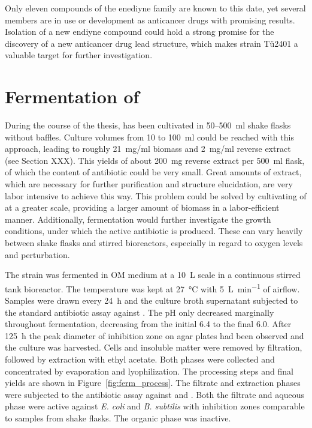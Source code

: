 Only eleven compounds of the enediyne family are known to this date, yet several members are in use or development as anticancer drugs with promising results.\autocite{Liang2010,Galm2005}
Isolation of a new endiyne compound could hold a strong promise for the discovery of a new anticancer drug lead structure, which makes strain Tü2401 a valuable target for further investigation.



\section{Fermentation of \tue{}} %
\label{sec:fermentation_of_tue}

During the course of the thesis, \tue{} has been cultivated in 50--500~ml shake flasks without baffles.
Culture volumes from 10 to 100~ml could be reached with this approach, leading to roughly 21~mg/ml biomass and 2~mg/ml reverse extract (see Section XXX).
This yields of about 200~mg reverse extract per 500~ml flask, of which the content of antibiotic could be very small.
Great amounts of extract, which are necessary for further purification and structure elucidation, are very labor intensive to achieve this way.
This problem could be solved by cultivating of \tue{} at a greater scale, providing a larger amount of biomass in a labor-efficient manner.
Additionally, fermentation would further investigate the growth conditions, under which the active antibiotic is produced.
These can vary heavily between shake flasks and stirred bioreactors, especially in regard to oxygen levels and perturbation.\autocite{Buchs2001}

The strain was fermented in OM medium at a \SI{10}{\liter} scale in a continuous stirred tank bioreactor.
The temperature was kept at \SI{27}{\celsius} with \SI{5}{\liter\per\minute} of airflow.
Samples were drawn every \SI{24}{\hour} and the culture broth supernatant subjected to the standard antibiotic assay against \coli{}.
The pH only decreased marginally throughout fermentation, decreasing from the initial 6.4 to the final 6.0.
After \SI{125}{\hour} the peak diameter of inhibition zone on agar plates had been observed and the culture was harvested.
Cells and insoluble matter were removed by filtration, followed by extraction with ethyl acetate.
Both phases were collected and concentrated by evaporation and lyophilization.
The processing steps and final yields are shown in Figure~\ref{fig:ferm_process}.
The filtrate and extraction phases were subjected to the antibiotic assay against \coli{} and \bac{}.
Both the filtrate and aqueous phase were active against \emph{E. coli} and \emph{B. subtilis} with inhibition zones comparable to samples from shake flasks.
The organic phase was inactive.

